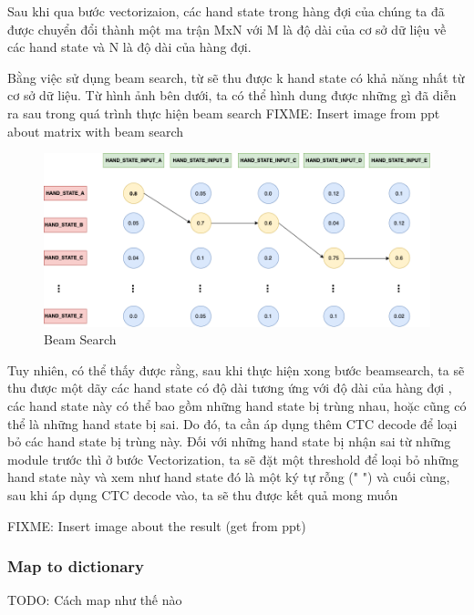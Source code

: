       Sau khi qua bước vectorizaion, các hand state trong hàng đợi của chúng ta
      đã được chuyển đổi thành một ma trận MxN với M là độ dài của cơ sở dữ liệu về
      các hand state và N là độ dài của hàng đợi.
      
      Bằng việc sử dụng beam search, từ sẽ thu được k hand state có khả năng nhất
      từ cơ sở dữ liệu. Từ hình ảnh bên dưới, ta có thể hình dung được những gì
      đã diễn ra sau trong quá trình thực hiện beam search
      FIXME: Insert image from ppt about matrix with beam search

      \begin{figure}[H]
        \centering
        \includegraphics[width=\textwidth]{img/Chap4/BeamSearch.png}
        \caption{ Beam Search }
        \label{fig:Chap4-BeamSearch }
      \end{figure}

      Tuy nhiên, có thể thấy được rằng, sau khi thực hiện xong bước beamsearch,
      ta sẽ thu được một dãy các hand state có độ dài tương ứng với độ dài của hàng đợi
      , các hand state này có thể bao gồm những hand state bị trùng nhau, hoặc cũng có thể
      là những hand state bị sai. Do đó, ta cần áp dụng thêm CTC decode để loại bỏ các hand state
      bị trùng này. Đối với những hand state bị nhận sai từ những module trước thì ở bước Vectorization,
      ta sẽ đặt một threshold để loại bỏ những hand state này và xem như hand state đó là một ký tự rỗng (" ")
      và cuối cùng, sau khi áp dụng CTC decode vào, ta sẽ thu được kết quả mong muốn

      FIXME: Insert image about the result (get from ppt)

      
      
    \subsubsection{ Map to dictionary }
      TODO: Cách map như thế nào


